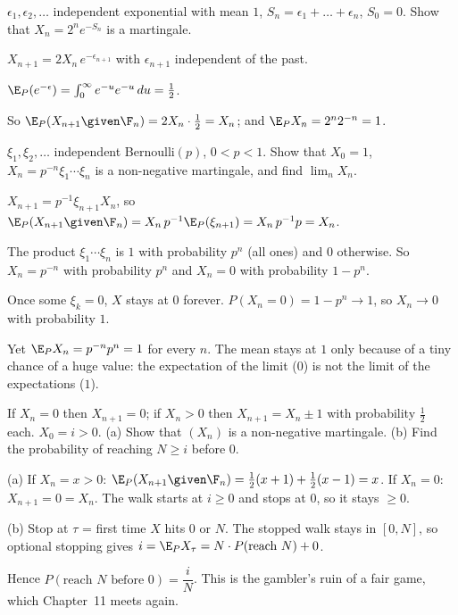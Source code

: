 \begin{problem}
$\epsilon_1,\epsilon_2,\ldots$ independent exponential with mean $1$, $S_n=\epsilon_1+\dots+\epsilon_n$, $S_0=0$. Show that $X_n=2^ne^{-S_n}$ is a martingale.
\begin{steps}
  \item $X_{n+1}=2X_n\,e^{-\epsilon_{n+1}}$ with $\epsilon_{n+1}$ independent of the past.
  \item $\E_P(e^{-\epsilon})=\int_0^\infty e^{-u}e^{-u}\,du=\frac12$.
  \item So $\E_P(X_{n+1}\given\F_n)=2X_n\cdot\frac12=X_n$; and $\E_PX_n=2^n2^{-n}=1$.
\end{steps}
\end{problem}

\begin{problem}
$\xi_1,\xi_2,\ldots$ independent Bernoulli$(p)$, $0<p<1$. Show that $X_0=1$, $X_n=p^{-n}\xi_1\cdots\xi_n$ is a non-negative martingale, and find $\lim_nX_n$.
\begin{steps}
  \item $X_{n+1}=p^{-1}\xi_{n+1}X_n$, so $\E_P(X_{n+1}\given\F_n)=X_n\,p^{-1}\E_P(\xi_{n+1})=X_n\,p^{-1}p=X_n$.
  \item The product $\xi_1\cdots\xi_n$ is $1$ with probability $p^n$ (all ones) and $0$ otherwise. So $X_n=p^{-n}$ with probability $p^n$ and $X_n=0$ with probability $1-p^n$.
  \item Once some $\xi_k=0$, $X$ stays at $0$ forever. $P(X_n=0)=1-p^n\to1$, so $X_n\to0$ with probability $1$.
\end{steps}
Yet $\E_PX_n=p^{-n}p^n=1$ for every $n$. The mean stays at $1$ only because of a tiny chance of a huge value: the expectation of the limit ($0$) is not the limit of the expectations ($1$).
\end{problem}

\begin{problem}
If $X_n=0$ then $X_{n+1}=0$; if $X_n>0$ then $X_{n+1}=X_n\pm1$ with probability $\frac12$ each. $X_0=i>0$. (a) Show that $(X_n)$ is a non-negative martingale. (b) Find the probability of reaching $N\ge i$ before $0$.
\begin{steps}
  \item (a) If $X_n=x>0$: $\E_P(X_{n+1}\given\F_n)=\frac12(x+1)+\frac12(x-1)=x$. If $X_n=0$: $X_{n+1}=0=X_n$. The walk starts at $i\ge0$ and stops at $0$, so it stays $\ge0$.
  \item (b) Stop at $\tau$ = first time $X$ hits $0$ or $N$. The stopped walk stays in $[0,N]$, so optional stopping gives $i=\E_PX_\tau=N\cdot P(\text{reach }N)+0$.
  \item Hence $P(\text{reach }N\text{ before }0)=\dfrac iN$. This is the gambler's ruin of a fair game, which Chapter~11 meets again.
\end{steps}
\end{problem}


